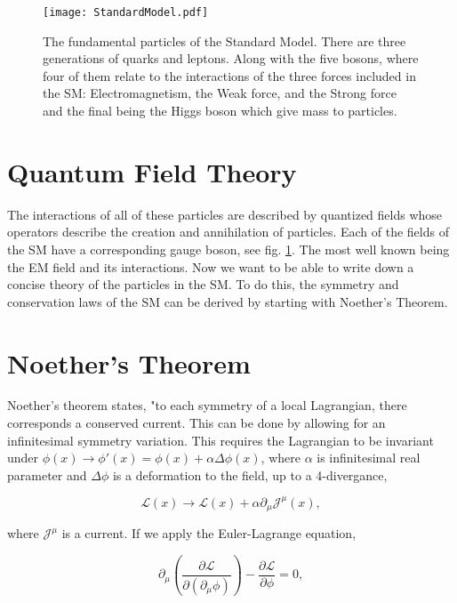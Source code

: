 \begin{figure}
 	\centering
	\texttt{[image: StandardModel.pdf]}
 	\caption{The fundamental particles of the Standard Model. There are three generations of quarks and leptons. Along with the five bosons, where four of them relate to the interactions of the three forces included in the SM: Electromagnetism, the Weak force, and the Strong force and the final being the Higgs boson which give mass to particles. }
 	\label{SMParticles} 
\end{figure}
 
 \section{Quantum Field Theory}
 \label{QFT}
 
 The interactions of all of these particles are described by quantized fields whose operators describe the creation and annihilation of particles. Each of the fields of the SM have a corresponding gauge boson, see fig. \ref{SMParticles}. The most well known being the EM field and its interactions. Now we want to be able to write down a concise theory of the particles in the SM. To do this, the symmetry and conservation laws of the SM can be derived by starting with Noether's Theorem.
 
 \section{Noether's Theorem}
 
 Noether's theorem states, "to each symmetry of a local Lagrangian, there corresponds a conserved current. This can be done by allowing for an infinitesimal symmetry variation. This requires the Lagrangian to be invariant under $\phi(x)\rightarrow\phi\prime(x)=\phi(x)+\alpha\Delta\phi(x)$, where $\alpha$ is infinitesimal real parameter and $\Delta\phi$ is a deformation to the field, up to a 4-divergance,
 
 \begin{equation}\label{LagrangeFluctuation}
 \mathcal{L}(x)\rightarrow\mathcal{L}(x)+\alpha\partial_\mu\mathcal{J}^\mu(x),
 \end{equation}
 
 where $\mathcal{J}^\mu$ is a current. If we apply the Euler-Lagrange equation,
 
 \begin{equation}
 \partial_\mu(\frac{\partial\mathcal{L}}{\partial(\partial_\mu\phi)})-\frac{\partial\mathcal{L}}{\partial\phi}=0,
 \end{equation}
 
